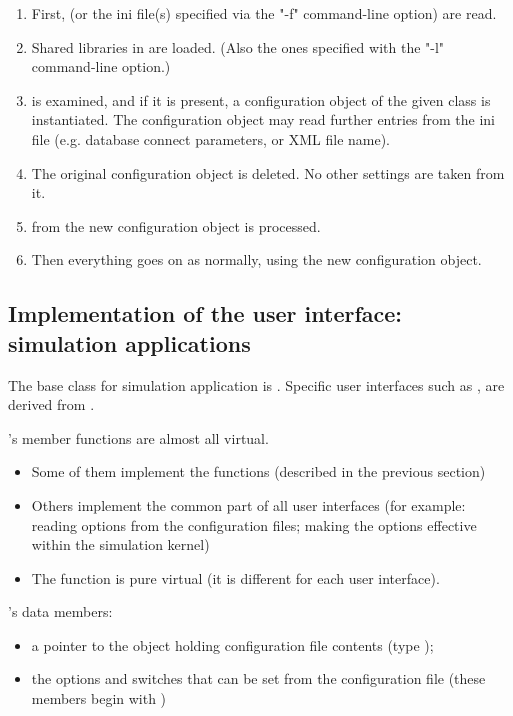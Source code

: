 \begin{enumerate}
  \item First,  (or the ini file(s) specified via the "-f"
     command-line option) are read.
  \item Shared libraries in  are loaded.
     (Also the ones specified with the "-l" command-line option.)
  \item {} is examined, and if it is present,
     a configuration object of the given class is instantiated.
     The configuration object may read further entries from the
     ini file (e.g. database connect parameters, or XML file name).
  \item The original   configuration
     object is deleted. No other settings are taken from it.
  \item {} from the new configuration object is
     processed.
  \item Then everything goes on as normally, using the new configuration
     object.
\end{enumerate}



\subsection{Implementation of the user interface: simulation applications}

The base class for simulation application is .
Specific user interfaces such as ,
 are derived from .

's member functions are almost all virtual.
\begin{itemize}
  \item{Some of them implement the  functions
    (described in the previous section)}
  \item{Others implement the common part of all user interfaces (for
    example: reading options from the configuration files; making the
    options effective within the simulation kernel)}
  \item{The  function is pure virtual (it is different
    for each user interface).}
\end{itemize}

's data members:
\begin{itemize}
  \item{a pointer to the object holding configuration file contents
    (type );}
  \item{the options and switches that can be set from the
    configuration file (these members begin with )}
\end{itemize}

